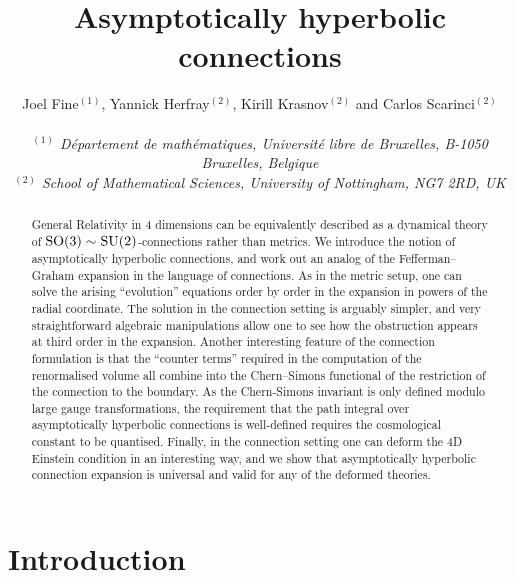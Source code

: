 \documentclass[a4paper,12pt]{article}
\begin{document}
 \pagestyle{plain}
\title{Asymptotically hyperbolic connections}
\author{Joel Fine${}^{(1)}$, Yannick Herfray${}^{(2)}$, Kirill Krasnov${}^{(2)}$ and Carlos Scarinci${}^{(2)}$\\ {}\\ 
{\small \it ${}^{(1)}$ D\'epartement de math\'ematiques, Universit\'e libre de Bruxelles, B-1050 Bruxelles, Belgique} 
\\
{\small \it ${}^{(2)}$ School of Mathematical Sciences, University of Nottingham, NG7 2RD, UK} }
\maketitle
\begin{abstract}\noindent
General Relativity in 4 dimensions can be equivalently described as a dynamical theory of ${\rm SO}(3)\sim {\rm SU}(2)$-connections rather than metrics. We introduce the notion of asymptotically hyperbolic connections, and work out an analog of the Fefferman--Graham expansion in the language of connections. As in the metric setup, one can solve the arising ``evolution'' equations order by order in the expansion in powers of the radial coordinate. The solution in the connection setting is arguably simpler, and very straightforward algebraic manipulations allow one to see how the obstruction appears at third order in the expansion. Another interesting feature of the connection formulation is that the ``counter terms'' required in the computation of the renormalised volume all combine into the Chern--Simons functional of the restriction of the connection to the boundary. As the Chern-Simons invariant is only defined modulo large gauge transformations, the requirement that the path integral over asymptotically hyperbolic connections is well-defined requires the cosmological constant to be quantised. Finally, in the connection setting one can deform the 4D Einstein condition in an interesting way, and we show that asymptotically hyperbolic connection expansion is universal and valid for any of the deformed theories. 
\end{abstract}


\section{Introduction}
\end{document}
